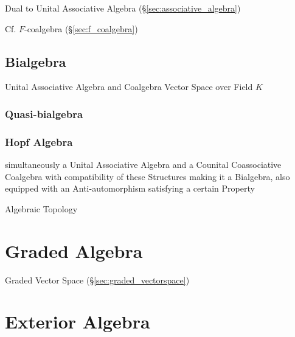 Dual to Unital Associative Algebra (\S\ref{sec:associative_algebra})

Cf. $F$-coalgebra (\S\ref{sec:f_coalgebra})



\subsection{Bialgebra}\label{sec:bialgebra}

Unital Associative Algebra and Coalgebra Vector Space over Field $K$



\subsubsection{Quasi-bialgebra}\label{sec:quasi_bialgebra}

\subsubsection{Hopf Algebra}\label{sec:hopf_algebra}

simultaneously a Unital Associative Algebra and a Counital
Coassociative Coalgebra with compatibility of these Structures making
it a Bialgebra, also equipped with an Anti-automorphism satisfying a
certain Property %

Algebraic Topology



\section{Graded Algebra}\label{sec:graded_algebra}

Graded Vector Space (\S\ref{sec:graded_vectorspace})



\section{Exterior Algebra}\label{sec:exterior_algebra}


